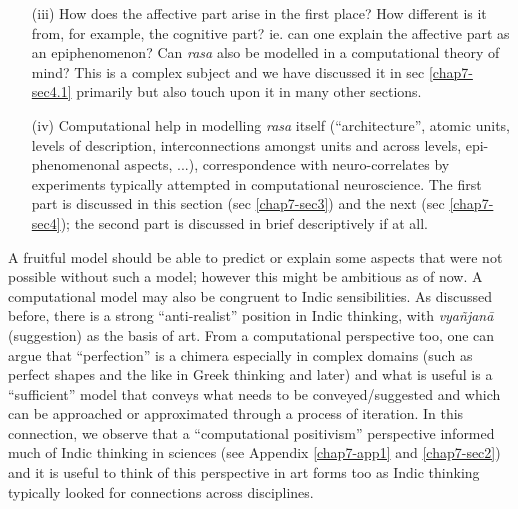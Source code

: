 \begin{itemize}
\item[(iii)] How does the affective part arise in the first place? How different is it from, for example, the cognitive part? ie. can one explain the affective part as an epiphenomenon? Can \textsl{rasa} also be modelled in a computational theory of mind? This is a complex subject and we have discussed it in sec \ref{chap7-sec4.1} primarily but also touch upon it in many other sections.

\item[(iv)] Computational help in modelling \textsl{rasa} itself (“architecture”, atomic units, levels of description, interconnections amongst units and across levels, epi-phenomenonal aspects, ...), correspondence with neuro-correlates by experiments typically attempted in computational neuroscience. The first part is discussed in this section (sec \ref{chap7-sec3}) and the next (sec \ref{chap7-sec4}); the second part is discussed in brief descriptively if at all.
\end{itemize}

A fruitful model should be able to predict or explain some aspects that were not possible without such a model; however this might be ambitious as of now. A computational model may also be congruent to Indic sensibilities. As discussed before, there is a strong “anti-realist” position in Indic thinking, with \textsl{vyañjanā} (suggestion) as the basis of art. From a computational perspective too, one can argue that “perfection” is a chimera especially in complex domains (such as perfect shapes and the like in Greek thinking and later) and what is useful is a “sufficient” model that conveys what needs to be conveyed/suggested and which can be approached or approximated through a process of iteration. In this connection, we observe that a “computational positivism” perspective informed much of Indic thinking in sciences (see Appendix \ref{chap7-app1} and \ref{chap7-sec2}) and it is useful to think of this perspective in art forms too as Indic thinking typically looked for connections across disciplines.

